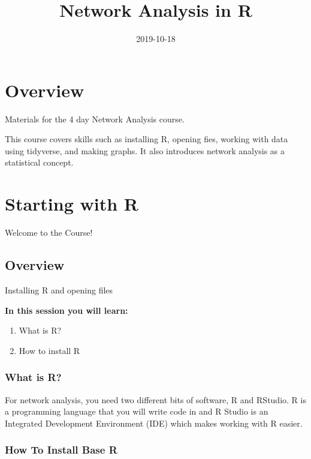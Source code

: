 \documentclass[]{book}
\title{Network Analysis in R}
\author{}
\date{2019-10-18}
\providecommand{\tightlist}{%
  \setlength{\itemsep}{0pt}\setlength{\parskip}{0pt}}
\begin{document}
\maketitle

{
\setcounter{tocdepth}{1}
\tableofcontents
}
\chapter*{Overview}\label{overview}

Materials for the 4 day Network Analysis course.

This course covers skills such as installing R, opening fies, working
with data using tidyverse, and making graphs. It also introduces network
analysis as a statistical concept.

\chapter{Starting with R}\label{starting-with-r}

{Welcome to the Course!}

\section{Overview}\label{overview-1}

Installing R and opening files

\textbf{In this session you will learn:}

\begin{enumerate}
\def\labelenumi{\arabic{enumi}.}
\tightlist
\item
  What is R?
\item
  How to install R
\end{enumerate}

\subsection{What is R?}\label{what-is-r}

For network analysis, you need two different bits of software, R and
RStudio. R is a programming language that you will write code in and R
Studio is an Integrated Development Environment (IDE) which makes
working with R easier.

\subsection{How To Install Base R}\label{how-to-install-base-r}
\end{document}
